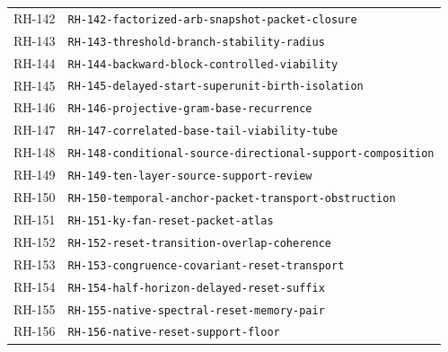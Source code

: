 \begin{longtable}{r >{\raggedright\arraybackslash}p{}}
RH-142 & \texttt{RH-\allowbreak{}142-\allowbreak{}factorized-\allowbreak{}arb-\allowbreak{}snapshot-\allowbreak{}packet-\allowbreak{}closure}\\
RH-143 & \texttt{RH-\allowbreak{}143-\allowbreak{}threshold-\allowbreak{}branch-\allowbreak{}stability-\allowbreak{}radius}\\
RH-144 & \texttt{RH-\allowbreak{}144-\allowbreak{}backward-\allowbreak{}block-\allowbreak{}controlled-\allowbreak{}viability}\\
RH-145 & \texttt{RH-\allowbreak{}145-\allowbreak{}delayed-\allowbreak{}start-\allowbreak{}superunit-\allowbreak{}birth-\allowbreak{}isolation}\\
RH-146 & \texttt{RH-\allowbreak{}146-\allowbreak{}projective-\allowbreak{}gram-\allowbreak{}base-\allowbreak{}recurrence}\\
RH-147 & \texttt{RH-\allowbreak{}147-\allowbreak{}correlated-\allowbreak{}base-\allowbreak{}tail-\allowbreak{}viability-\allowbreak{}tube}\\
RH-148 & \texttt{RH-\allowbreak{}148-\allowbreak{}conditional-\allowbreak{}source-\allowbreak{}directional-\allowbreak{}support-\allowbreak{}composition}\\
RH-149 & \texttt{RH-\allowbreak{}149-\allowbreak{}ten-\allowbreak{}layer-\allowbreak{}source-\allowbreak{}support-\allowbreak{}review}\\
RH-150 & \texttt{RH-\allowbreak{}150-\allowbreak{}temporal-\allowbreak{}anchor-\allowbreak{}packet-\allowbreak{}transport-\allowbreak{}obstruction}\\
RH-151 & \texttt{RH-\allowbreak{}151-\allowbreak{}ky-\allowbreak{}fan-\allowbreak{}reset-\allowbreak{}packet-\allowbreak{}atlas}\\
RH-152 & \texttt{RH-\allowbreak{}152-\allowbreak{}reset-\allowbreak{}transition-\allowbreak{}overlap-\allowbreak{}coherence}\\
RH-153 & \texttt{RH-\allowbreak{}153-\allowbreak{}congruence-\allowbreak{}covariant-\allowbreak{}reset-\allowbreak{}transport}\\
RH-154 & \texttt{RH-\allowbreak{}154-\allowbreak{}half-\allowbreak{}horizon-\allowbreak{}delayed-\allowbreak{}reset-\allowbreak{}suffix}\\
RH-155 & \texttt{RH-\allowbreak{}155-\allowbreak{}native-\allowbreak{}spectral-\allowbreak{}reset-\allowbreak{}memory-\allowbreak{}pair}\\
RH-156 & \texttt{RH-\allowbreak{}156-\allowbreak{}native-\allowbreak{}reset-\allowbreak{}support-\allowbreak{}floor}\\

\end{longtable}
